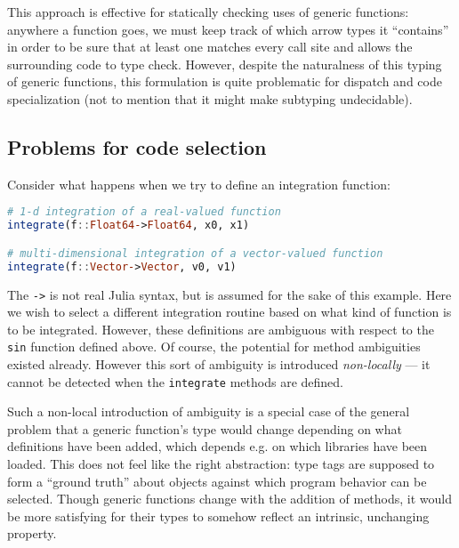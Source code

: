 This approach is effective for statically checking uses of generic
functions: anywhere a function goes, we must keep track of which arrow
types it ``contains'' in order to be sure that at least one matches
every call site and allows the surrounding code to type check.
However, despite the naturalness of this typing of generic functions,
this formulation is quite problematic for dispatch and code specialization
(not to mention that it might make subtyping undecidable).

\subsection{Problems for code selection}

Consider what happens when we try to define an integration function:

\begin{singlespace}
\begin{lstlisting}[language=julia]
# 1-d integration of a real-valued function
integrate(f::Float64->Float64, x0, x1)

# multi-dimensional integration of a vector-valued function
integrate(f::Vector->Vector, v0, v1)
\end{lstlisting}
\end{singlespace}

\noindent
The \texttt{->} is not real Julia syntax, but is assumed for the sake of
this example.
Here we wish to select a different integration routine based on what
kind of function is to be integrated.
However, these definitions are ambiguous with respect to the \texttt{sin}
function defined above.
Of course, the potential for method ambiguities existed already.
However this sort of ambiguity is introduced \emph{non-locally} ---
it cannot be detected when the \texttt{integrate} methods are defined.


Such a non-local introduction of ambiguity is a special case of the
general problem that a generic function's type would change depending
on what definitions have been added, which depends e.g. on which libraries
have been loaded. This does not feel like the right abstraction:
type tags are supposed to form a ``ground truth'' about objects against
which program behavior can be selected. Though generic functions change
with the addition of methods, it would be more satisfying for their
types to somehow reflect an intrinsic, unchanging property.

